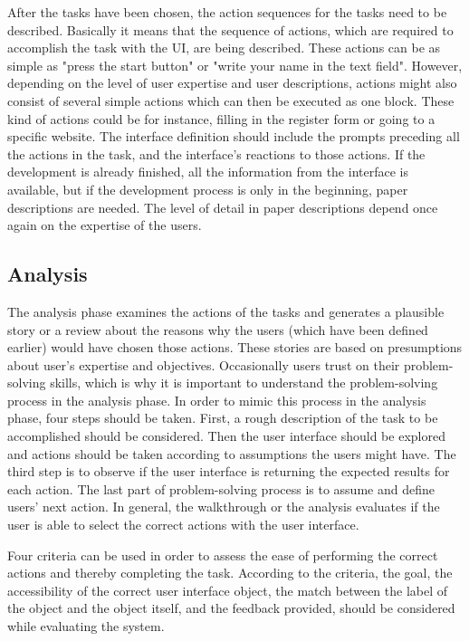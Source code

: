 \documentclass[12pt,a4paper,oneside,pdftex]{report}
\begin{document}
After the tasks have been chosen, the action sequences for the tasks need to be described. Basically it means that the sequence of actions, which are required to accomplish the task with the UI, are being described. These actions can be as simple as "press the start button" or "write your name in the text field". However, depending on the level of user expertise and user descriptions, actions might also consist of several simple actions which can then be executed as one block. These kind of actions could be for instance, filling in the register form or going to a specific website. The interface definition should include the prompts preceding all the actions in the task, and the interface's reactions to those actions. If the development is already finished, all the information from the interface is available, but if the development process is only in the beginning, paper descriptions are needed. The level of detail in paper descriptions depend once again on the expertise of the users. \cite{RefWorks:26}

\subsection{Analysis}

The analysis phase examines the actions of the tasks and generates a plausible story or a review about the reasons why the users (which have been defined earlier) would have chosen those actions. These stories are based on presumptions about user's expertise and objectives. Occasionally users trust on their problem-solving skills, which is why it is important to understand the problem-solving process in the analysis phase. In order to mimic this process in the analysis phase, four steps should be taken. First, a rough description of the task to be accomplished should be considered. Then the user interface should be explored and actions should be taken according to assumptions the users might have. The third step is to observe if the user interface is returning the expected results for each action. The last part of problem-solving process is to assume and define users' next action.\cite{RefWorks:26} In general, the walkthrough or the analysis evaluates if the user is able to select the correct actions with the user interface.

Four criteria can be used in order to assess the ease of performing the correct actions and thereby completing the task. According to the criteria, the goal, the accessibility of the correct user interface object, the match between the label of the object and the object itself, and the feedback provided, should be considered while evaluating the system. \cite{RefWorks:34}
\end{document}
